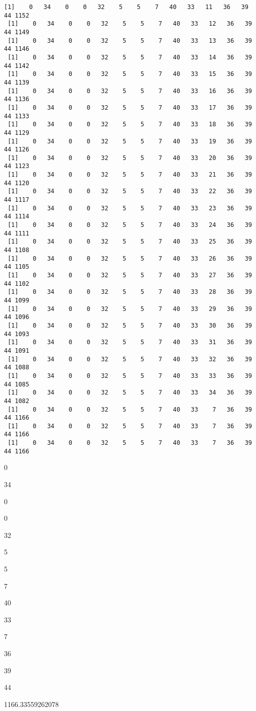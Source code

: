 \documentclass[11pt]{article}
\begin{document}
\begin{Verbatim}[commandchars=\\\{\}]
 [1]    0   34    0    0   32    5    5    7   40   33   11   36   39   44 1152
 [1]    0   34    0    0   32    5    5    7   40   33   12   36   39   44 1149
 [1]    0   34    0    0   32    5    5    7   40   33   13   36   39   44 1146
 [1]    0   34    0    0   32    5    5    7   40   33   14   36   39   44 1142
 [1]    0   34    0    0   32    5    5    7   40   33   15   36   39   44 1139
 [1]    0   34    0    0   32    5    5    7   40   33   16   36   39   44 1136
 [1]    0   34    0    0   32    5    5    7   40   33   17   36   39   44 1133
 [1]    0   34    0    0   32    5    5    7   40   33   18   36   39   44 1129
 [1]    0   34    0    0   32    5    5    7   40   33   19   36   39   44 1126
 [1]    0   34    0    0   32    5    5    7   40   33   20   36   39   44 1123
 [1]    0   34    0    0   32    5    5    7   40   33   21   36   39   44 1120
 [1]    0   34    0    0   32    5    5    7   40   33   22   36   39   44 1117
 [1]    0   34    0    0   32    5    5    7   40   33   23   36   39   44 1114
 [1]    0   34    0    0   32    5    5    7   40   33   24   36   39   44 1111
 [1]    0   34    0    0   32    5    5    7   40   33   25   36   39   44 1108
 [1]    0   34    0    0   32    5    5    7   40   33   26   36   39   44 1105
 [1]    0   34    0    0   32    5    5    7   40   33   27   36   39   44 1102
 [1]    0   34    0    0   32    5    5    7   40   33   28   36   39   44 1099
 [1]    0   34    0    0   32    5    5    7   40   33   29   36   39   44 1096
 [1]    0   34    0    0   32    5    5    7   40   33   30   36   39   44 1093
 [1]    0   34    0    0   32    5    5    7   40   33   31   36   39   44 1091
 [1]    0   34    0    0   32    5    5    7   40   33   32   36   39   44 1088
 [1]    0   34    0    0   32    5    5    7   40   33   33   36   39   44 1085
 [1]    0   34    0    0   32    5    5    7   40   33   34   36   39   44 1082
 [1]    0   34    0    0   32    5    5    7   40   33    7   36   39   44 1166
 [1]    0   34    0    0   32    5    5    7   40   33    7   36   39   44 1166
 [1]    0   34    0    0   32    5    5    7   40   33    7   36   39   44 1166

    \end{Verbatim}

    \begin{enumerate*}
\item 0
\item 34
\item 0
\item 0
\item 32
\item 5
\item 5
\item 7
\item 40
\item 33
\item 7
\item 36
\item 39
\item 44
\end{enumerate*}


    
    1166.33559262078

    

    
    
    
    
\end{document}
